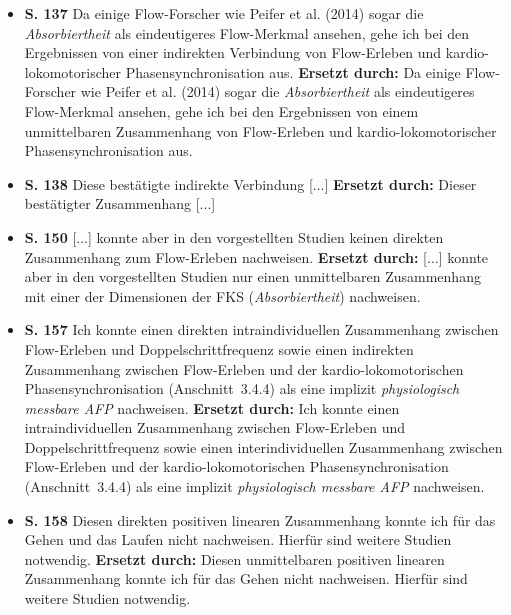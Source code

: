 \documentclass[12pt, twoside=semi, DIV=calc, pagesize, parskip=half, listof=totoc, bibliography=totoc, open=right, listof=nochaptergap, pointlessnumbers, final]{scrreprt}
\begin{document}
\begin{itemize}
\item \textbf{S. 137} Da einige Flow-Forscher wie Peifer et al. (2014) sogar die \emph{Absorbiertheit} als eindeutigeres Flow-Merkmal ansehen, gehe ich bei den Ergebnissen von einer indirekten Verbindung von Flow-Erleben und kardio-lokomotorischer Phasensynchronisation aus. \textbf{Ersetzt durch:} Da einige Flow-Forscher wie Peifer et al. (2014) sogar die \emph{Absorbiertheit} als eindeutigeres Flow-Merkmal ansehen, gehe ich bei den Ergebnissen von einem unmittelbaren Zusammenhang von Flow-Erleben und kardio-lokomotorischer Phasensynchronisation aus.

\item \textbf{S. 138} Diese bestätigte indirekte Verbindung [...] \textbf{Ersetzt durch:} Dieser bestätigter Zusammenhang [...]

\item \textbf{S. 150} [...] konnte aber in den vorgestellten Studien keinen direkten Zusammenhang zum Flow-Erleben nachweisen. \textbf{Ersetzt durch:} [...] konnte aber in den vorgestellten Studien nur einen unmittelbaren Zusammenhang mit einer der Dimensionen der FKS (\emph{Absorbiertheit}) nachweisen.

\item \textbf{S. 157} Ich konnte einen direkten intraindividuellen Zusammenhang zwischen Flow-Erleben und Doppelschrittfrequenz sowie einen indirekten Zusammenhang zwischen Flow-Erleben und der kardio-lokomotorischen Phasensynchronisation (Anschnitt~3.4.4) als eine implizit \emph{physiologisch messbare AFP} nachweisen. \textbf{Ersetzt durch:} Ich konnte einen intraindividuellen Zusammenhang zwischen Flow-Erleben und Doppelschrittfrequenz sowie einen interindividuellen Zusammenhang zwischen Flow-Erleben und der kardio-lokomotorischen Phasensynchronisation (Anschnitt~3.4.4) als eine implizit \emph{physiologisch messbare AFP} nachweisen.

\item \textbf{S. 158} Diesen direkten positiven linearen Zusammenhang konnte ich für das Gehen und das Laufen nicht nachweisen. Hierfür sind weitere Studien notwendig. \textbf{Ersetzt durch:} Diesen unmittelbaren positiven linearen Zusammenhang konnte ich für das Gehen nicht nachweisen. Hierfür sind weitere Studien notwendig.

\end{itemize}
\end{document}
